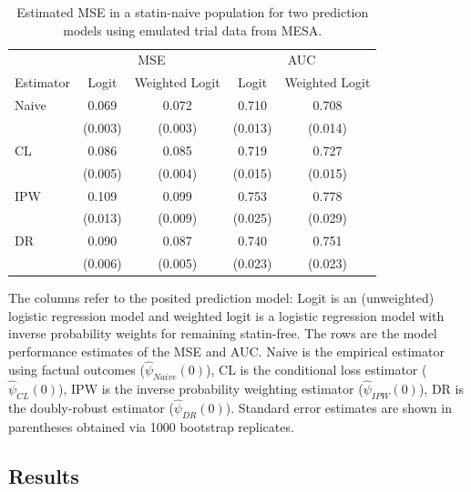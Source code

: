 \begin{table}[t]
    \centering
    \caption{Estimated MSE in a statin-naive population for two prediction models using emulated trial data from MESA.}
    \begin{threeparttable}
        \begin{tabular}{lcccc}
        \toprule
        \multicolumn{1}{c}{ } & \multicolumn{2}{c}{MSE} & \multicolumn{2}{c}{AUC} \\
        \cmidrule(l{3pt}r{3pt}){2-3} \cmidrule(l{3pt}r{3pt}){4-5}
        Estimator & Logit & Weighted Logit & Logit & Weighted Logit\\
        \midrule
        Naive & 0.069 & 0.072 & 0.710 & 0.708\\
         & (0.003) & (0.003) & (0.013) & (0.014)\\
        CL & 0.086 & 0.085 & 0.719 & 0.727\\
         & (0.005) & (0.004) & (0.015) & (0.015)\\
        IPW & 0.109 & 0.099 & 0.753 & 0.778\\
         & (0.013) & (0.009) & (0.025) & (0.029)\\
        DR & 0.090 & 0.087 & 0.740 & 0.751\\
         & (0.006) & (0.005) & (0.023) & (0.023)\\
        \bottomrule
        \end{tabular}
        \centering
        \begin{tablenotes}[flushleft]
        \item The columns refer to the posited prediction model: Logit is an (unweighted) logistic regression model and weighted logit is a logistic regression model with inverse probability weights for remaining statin-free. The rows are the model performance estimates of the MSE and AUC. Naive is the empirical estimator using factual outcomes ($\widehat{\psi}_{Naive}(0)$), CL is the conditional loss estimator ($\widehat{\psi}_{CL}(0)$), IPW is the inverse probability weighting estimator ($\widehat{\psi}_{IPW}(0)$), DR is the doubly-robust estimator ($\widehat{\psi}_{DR}(0)$). Standard error estimates are shown in parentheses obtained via 1000 bootstrap replicates.
        \end{tablenotes}
        \end{threeparttable}
\end{table}

\subsection{Results}


